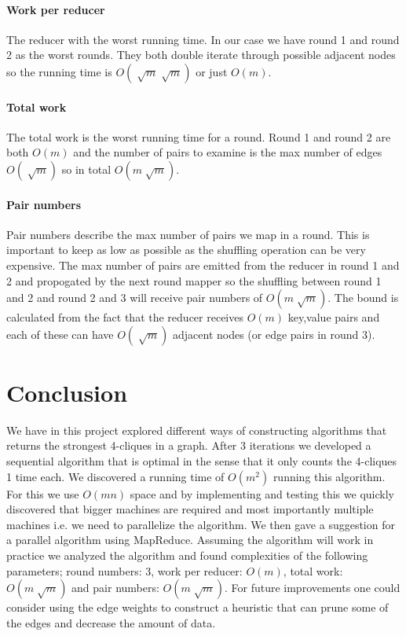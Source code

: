 \documentclass{article}
\begin{document}
\paragraph{Work per reducer}
The reducer with the worst running time. In our case we have round 1 and round 2 as the worst rounds. They both double iterate through possible adjacent nodes so the running time is $O(\sqrt[]{m}\sqrt[]{m})$ or just $O(m)$.

\paragraph{Total work}
The total work is the worst running time for a round. Round 1 and round 2 are both $O(m)$ and the number of pairs to examine is the max number of edges $O(\sqrt[]{m})$ so in total $O(m\sqrt[]{m})$.

\paragraph{Pair numbers}
Pair numbers describe the max number of pairs we map in a round. This is important to keep as low as possible as the shuffling operation can be very expensive. The max number of pairs are emitted from the reducer in round 1 and 2 and propogated by the next round mapper so the shuffling between round 1 and 2 and round 2 and 3 will receive pair numbers of $O(m\sqrt[]{m})$. The bound is calculated from the fact that the reducer receives $O(m)$ key,value pairs and each of these can have $O(\sqrt[]{m})$ adjacent nodes (or edge pairs in round 3).

\section{Conclusion}
We have in this project explored different ways of constructing algorithms that returns the strongest 4-cliques in a graph. After 3 iterations we developed a sequential algorithm that is optimal in the sense that it only counts the 4-cliques 1 time each. We discovered a running time of $O(m^{2})$ running this algorithm. For this we use $O(mn)$ space and by implementing and testing this we quickly discovered that bigger machines are required and most importantly multiple machines i.e. we need to parallelize the algorithm.
We then gave a suggestion for a parallel algorithm using MapReduce. Assuming the algorithm will work in practice we analyzed the algorithm and found complexities of the following parameters; round numbers: 3, work per reducer: $O(m)$, total work: $O(m\sqrt[]{m})$ and pair numbers: $O(m\sqrt[]{m})$.
For future improvements one could consider using the edge weights to construct a heuristic that can prune some of the edges and decrease the amount of data.
\end{document}
